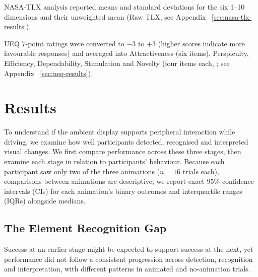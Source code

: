 \documentclass[
english,                 %
bibtex,                  %
includeExtraAbstracts, %
]{kththesis}
\numberwithin{listing}{chapter}
\begin{document}
NASA-TLX analysis reported means and standard deviations for the six 1--10 dimensions and their unweighted mean (Raw TLX, see Appendix ~\ref{sec:nasa-tlx-results}).

UEQ 7-point ratings were converted to $-3$ to $+3$ (higher scores indicate more favourable responses) and averaged into Attractiveness (six items), Perspicuity, Efficiency, Dependability, Stimulation and Novelty (four items each, \cite{laugwitzConstructionEvaluationUser2008}; see Appendix ~\ref{sec:ueq-results}).

\begingroup
\raggedbottom
\renewenvironment{evidenceblock}{\par\addvspace{4pt}}{\par\addvspace{4pt}}
\renewcommand{\topfraction}{0.72}
\renewcommand{\bottomfraction}{0.50}
\renewcommand{\textfraction}{0.16}
\setcounter{topnumber}{2}
\setcounter{bottomnumber}{2}
\setcounter{totalnumber}{3}
\setlength{\intextsep}{8pt plus 2pt minus 1pt}
\chapter{Results}
\setcounter{secnumdepth}{2}
\label{ch:results}

To understand if the ambient display supports peripheral interaction while driving, we examine how well participants detected, recognised and interpreted visual changes. We first compare performance across these three stages, then examine each stage in relation to participants’ behaviour. Because each participant saw only two of the three animations ($n = 16$ trials each), comparisons between animations are descriptive; we report exact 95\% confidence intervals (CIs) for each animation's binary outcomes and interquartile ranges (IQRs) alongside medians.

\section{The Element Recognition Gap}
\label{sec:detection-recognition-interpretation-gap}

Success at an earlier stage might be expected to support success at the next, yet performance did not follow a consistent progression across detection, recognition and interpretation, with different patterns in animated and no-animation trials.
\end{document}
